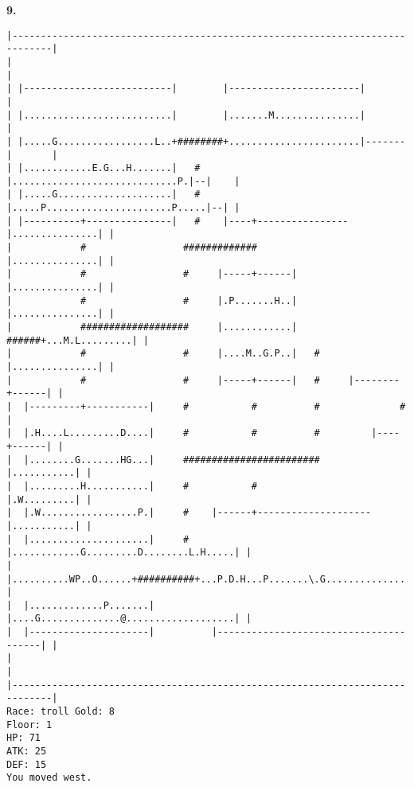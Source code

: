 \documentclass[11pt]{article}
\theoremstyle{plain}
\begin{document}
\newpage
\textbf{9. }
\begin{Verbatim}[fontsize=\scriptsize]
|-----------------------------------------------------------------------------|
|                                                                             |
| |--------------------------|        |-----------------------|               |
| |..........................|        |.......M...............|               |
| |.....G.................L..+########+.......................|-------|       |
| |............E.G...H.......|   #    |.............................P.|--|    |
| |.....G....................|   #    |.....P......................P.....|--| |
| |----------+---------------|   #    |----+----------------|...............| |
|            #                 #############                |...............| |
|            #                 #     |-----+------|         |...............| |
|            #                 #     |.P.......H..|         |...............| |
|            ###################     |............|   ######+...M.L.........| |
|            #                 #     |....M..G.P..|   #     |...............| |
|            #                 #     |-----+------|   #     |--------+------| |
|  |---------+-----------|     #           #          #              #        |
|  |.H....L.........D....|     #           #          #         |----+------| |
|  |........G.......HG...|     ########################         |...........| |
|  |.........H...........|     #           #                    |.W.........| |
|  |.W.................P.|     #    |------+--------------------|...........| |
|  |.....................|     #    |............G.........D........L.H.....| |
|  |..........WP..O......+##########+...P.D.H...P.......\.G.................| |
|  |.............P.......|          |....G..............@...................| |
|  |---------------------|          |---------------------------------------| |
|                                                                             |
|-----------------------------------------------------------------------------|
Race: troll Gold: 8                                                    Floor: 1
HP: 71
ATK: 25
DEF: 15
You moved west. 


\end{Verbatim}
\end{document}
